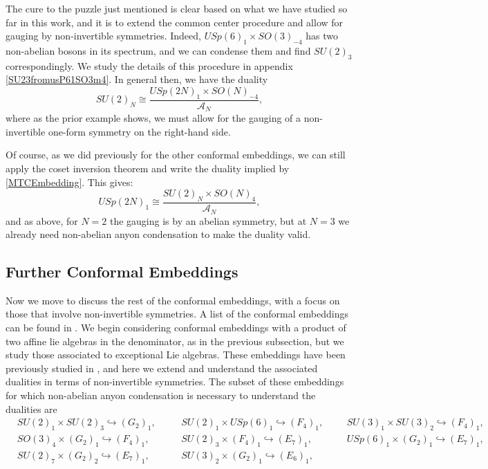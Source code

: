 \documentclass[11pt]{article}
\numberwithin{equation}{section}
\begin{document}
The cure to the puzzle just mentioned is clear based on what we have studied so far in this work, and it is to extend the common center procedure and allow for gauging by non-invertible symmetries. Indeed, $USp(6)_{1} \times SO(3)_{-4}$ has two non-abelian bosons in its spectrum, and we can condense them and find $SU(2)_{3}$ correspondingly. We study the details of this procedure in appendix \ref{SU23fromusP61SO3m4}. In general then, we have the duality
\begin{equation}
    SU(2)_{N} \cong \frac{USp(2N)_{1} \times SO(N)_{-4}}{\mathcal{A}_{N}},
\end{equation}
where as the prior example shows, we must allow for the gauging of a non-invertible one-form symmetry on the right-hand side.

Of course, as we did previously for the other conformal embeddings, we can still apply the coset inversion theorem and write the duality implied by \eqref{MTCEmbedding}. This gives:
\begin{equation}
    USp(2N)_{1} \cong \frac{SU(2)_{N} \times SO(N)_{4}}{\mathcal{A}_{N}},
\end{equation}
and as above, for $N=2$ the gauging is by an abelian symmetry, but at $N=3$ we already need non-abelian anyon condensation to make the duality valid.







\subsection{Further Conformal Embeddings} \label{FurtherConformalEmbeddings}

Now we move to discuss the rest of the conformal embeddings, with a focus on those that involve non-invertible symmetries. A list of the conformal embeddings can be found in \cite{davydov2013witt}. We begin considering conformal embeddings with a product of two affine lie algebras in the denominator, as in the previous subsection, but we study those associated to exceptional Lie algebras. These embeddings have been previously studied in \cite{Cordova:2018qvg}, and here we extend and understand the associated dualities in terms of non-invertible symmetries. The subset of these embeddings for which non-abelian anyon condensation is necessary to understand the dualities are
\begin{align}
    &SU(2)_{1} \times SU(2)_{3} \hookrightarrow (G_{2})_{1}, \quad
    &&SU(2)_{1} \times USp(6)_{1} \hookrightarrow (F_{4})_{1},
    &&&SU(3)_{1} \times SU(3)_{2} \hookrightarrow (F_{4})_{1}, \nonumber \\[0.3cm]
    &SO(3)_{4} \times (G_{2})_{1} \hookrightarrow (F_{4})_{1}, \quad
    &&SU(2)_{3} \times (F_{4})_{1} \hookrightarrow (E_{7})_{1}, 
    &&&USp(6)_{1} \times (G_{2})_{1} \hookrightarrow (E_{7})_{1}, \nonumber \\[0.3cm]
    &SU(2)_{7} \times (G_{2})_{2} \hookrightarrow (E_{7})_{1}, \quad
    &&SU(3)_{2} \times (G_{2})_{1} \hookrightarrow (E_{6})_{1}, \label{exceptionalconformalembeddings}
\end{align} 
\end{document}
